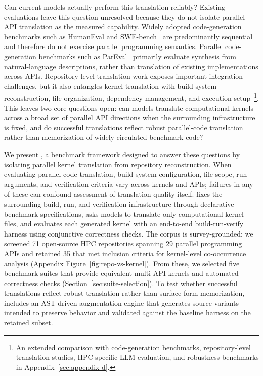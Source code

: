 Can current models actually perform this translation reliably? Existing evaluations leave this question unresolved because they do not isolate parallel API translation as the measured capability. Widely adopted code-generation benchmarks such as HumanEval and SWE-bench~\cite{HumanEval2021, SWEbench2024} are predominantly sequential and therefore do not exercise parallel programming semantics. Parallel code-generation benchmarks such as ParEval~\cite{ParEval2024} primarily evaluate synthesis from natural-language descriptions, rather than translation of existing implementations across APIs. Repository-level translation work exposes important integration challenges, but it also entangles kernel translation with build-system reconstruction, file organization, dependency management, and execution setup~\cite{ParEvalRepo2025,Wang2026RepoTransBench}\footnote{An extended comparison with code-generation benchmarks, repository-level translation studies, HPC-specific LLM evaluation, and robustness benchmarks in Appendix~\ref{sec:appendix-d}.}. This leaves two core questions open: can models translate computational kernels across a broad set of parallel API directions when the surrounding infrastructure is fixed, and do successful translations reflect robust parallel-code translation rather than memorization of widely circulated benchmark code? 

We present \textsc{\parbench{}}, a benchmark framework designed to answer these questions by isolating parallel kernel translation from repository reconstruction. When evaluating parallel code translation, build-system configuration, file scope, run arguments, and verification criteria vary across kernels and APIs; failures in any of these can confound assessment of translation quality itself. \textsc{\parbench{}} fixes the surrounding build, run, and verification infrastructure through declarative benchmark specifications, asks models to translate only computational kernel files, and evaluates each generated kernel with an end-to-end build-run-verify harness using conjunctive correctness checks. The corpus is survey-grounded: we screened 71 open-source HPC repositories spanning 29 parallel programming APIs and retained 35 that met inclusion criteria for kernel-level co-occurrence analysis (Appendix Figure~\ref{fig:repo-vs-kernel}). From these, we selected five benchmark suites that provide equivalent multi-API kernels and automated correctness checks (Section~\ref{sec:suite-selection}). To test whether successful translations reflect robust translation rather than surface-form memorization, \textsc{\parbench{}} includes an AST-driven augmentation engine that generates source variants intended to preserve behavior and validated against the baseline harness on the retained subset.

